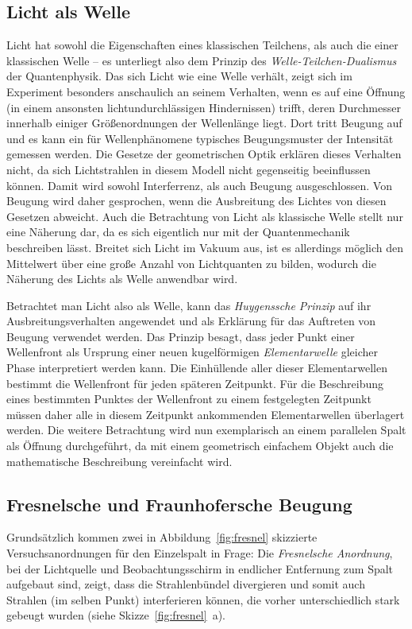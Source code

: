 \subsection{Licht als Welle}
\label{sec:welle}
Licht hat sowohl die Eigenschaften eines klassischen Teilchens, als auch die einer klassischen Welle -- es unterliegt also dem Prinzip des \emph{Welle-Teilchen-Dualismus} der Quantenphysik. Das sich Licht wie eine Welle verhält, zeigt sich im Experiment besonders anschaulich an seinem Verhalten, wenn es auf eine Öffnung (in einem ansonsten lichtundurchlässigen Hindernissen) trifft, deren Durchmesser innerhalb einiger Größenordnungen der Wellenlänge liegt. Dort tritt Beugung auf und es kann ein für Wellenphänomene typisches Beugungsmuster der Intensität gemessen werden. Die Gesetze der geometrischen Optik erklären dieses Verhalten nicht, da sich Lichtstrahlen in diesem Modell nicht gegenseitig beeinflussen können. Damit wird sowohl Interferrenz, als auch Beugung ausgeschlossen. Von Beugung wird daher gesprochen, wenn die Ausbreitung des Lichtes von diesen Gesetzen abweicht. Auch die Betrachtung von Licht als klassische Welle stellt nur eine Näherung dar, da es sich eigentlich nur mit der Quantenmechanik beschreiben lässt. Breitet sich Licht im Vakuum aus, ist es allerdings möglich den Mittelwert über eine große Anzahl von Lichtquanten zu bilden, wodurch die Näherung des Lichts als Welle anwendbar wird.

Betrachtet man Licht also als Welle, kann das \emph{Huygenssche Prinzip} auf ihr Ausbreitungsverhalten angewendet und als Erklärung für das Auftreten von Beugung verwendet werden. Das Prinzip besagt, dass jeder Punkt einer Wellenfront als Ursprung einer neuen kugelförmigen \emph{Elementarwelle} gleicher Phase interpretiert werden kann. Die Einhüllende aller dieser Elementarwellen bestimmt die Wellenfront für jeden späteren Zeitpunkt. Für die Beschreibung eines bestimmten Punktes der Wellenfront zu einem festgelegten Zeitpunkt müssen daher alle in diesem Zeitpunkt ankommenden Elementarwellen überlagert werden. Die weitere Betrachtung wird nun exemplarisch an einem parallelen Spalt als Öffnung durchgeführt, da mit einem geometrisch einfachem Objekt auch die mathematische Beschreibung vereinfacht wird.

\subsection{Fresnelsche und Fraunhofersche Beugung}

Grundsätzlich kommen zwei in Abbildung~\ref{fig:fresnel} skizzierte Versuchsanordnungen für den Einzelspalt in Frage: Die \emph{Fresnelsche Anordnung}, bei der Lichtquelle und Beobachtungsschirm in endlicher Entfernung zum Spalt aufgebaut sind, zeigt, dass die Strahlenbündel divergieren und somit auch Strahlen (im selben Punkt) interferieren können, die vorher unterschiedlich stark gebeugt wurden (siehe Skizze~\ref{fig:fresnel}~a).

